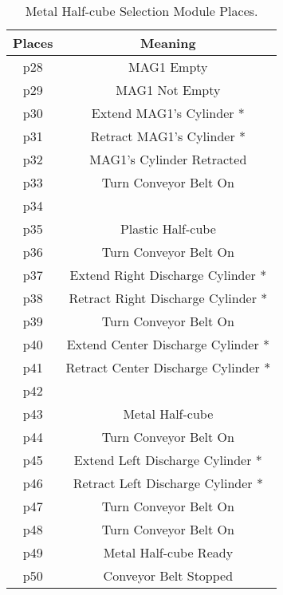 \begin{table}[htbp]
\caption{Metal Half-cube Selection Module Places.}
\centering
\begin{tabular}{cc}
Places & Meaning\\
\hline
p28 & MAG1 Empty\\
p29 & MAG1 Not Empty\\
p30 & Extend MAG1's Cylinder *\\
p31 & Retract MAG1's Cylinder *\\
p32 & MAG1's Cylinder Retracted\\
p33 & Turn Conveyor Belt On\\
p34 & \\
p35 & Plastic Half-cube\\
p36 & Turn Conveyor Belt On\\
p37 & Extend Right Discharge Cylinder *\\
p38 & Retract Right Discharge Cylinder *\\
p39 & Turn Conveyor Belt On\\
p40 & Extend Center Discharge Cylinder *\\
p41 & Retract Center Discharge Cylinder *\\
p42 & \\
p43 & Metal Half-cube\\
p44 & Turn Conveyor Belt On\\
p45 & Extend Left Discharge Cylinder *\\
p46 & Retract Left Discharge Cylinder *\\
p47 & Turn Conveyor Belt On\\
p48 & Turn Conveyor Belt On\\
p49 & Metal Half-cube Ready\\
p50 & Conveyor Belt Stopped\\
\end{tabular}
\end{table}

